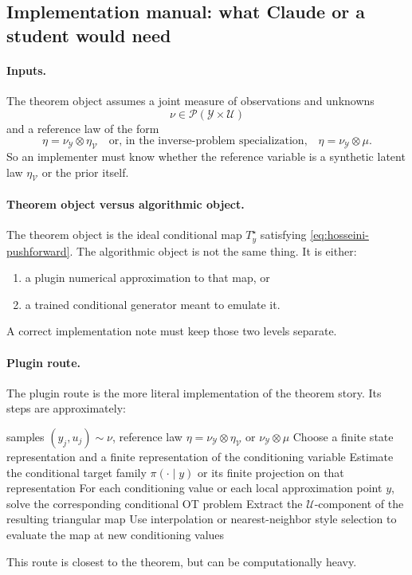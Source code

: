 \documentclass[11pt]{report}
\newcommand{\calP}{\mathcal{P}}
\begin{document}
\subsection*{Implementation manual: what Claude or a student would need}

\paragraph{Inputs.}
The theorem object assumes a joint measure of observations and unknowns
\begin{equation}
\nu \in \calP(\mathcal Y\times \mathcal U)
\label{eq:hosseini-joint-measure}
\end{equation}
and a reference law of the form
\begin{equation}
\eta = \nu_{\mathcal Y}\otimes \eta_{\mathcal V}
\quad\text{or, in the inverse-problem specialization,}\quad
\eta = \nu_{\mathcal Y}\otimes \mu.
\label{eq:hosseini-reference-law}
\end{equation}
So an implementer must know whether the reference variable is a synthetic latent
law $\eta_{\mathcal V}$ or the prior itself.

\paragraph{Theorem object versus algorithmic object.}
The theorem object is the ideal conditional map $T_y^\star$ satisfying
\eqref{eq:hosseini-pushforward}.  The algorithmic object is not the same thing.
It is either:
\begin{enumerate}[label=(\roman*)]
  \item a plugin numerical approximation to that map, or
  \item a trained conditional generator meant to emulate it.
\end{enumerate}
A correct implementation note must keep those two levels separate.

\paragraph{Plugin route.}
The plugin route is the more literal implementation of the theorem story.  Its
steps are approximately:
\begin{algorithm}[ht]
\caption{Plugin conditional OT pipeline}
\begin{algorithmic}[1]
\Require samples $(y_j,u_j)\sim \nu$, reference law $\eta=\nu_{\mathcal Y}\otimes\eta_{\mathcal V}$ or $\nu_{\mathcal Y}\otimes\mu$
\State Choose a finite state representation and a finite representation of the conditioning variable
\State Estimate the conditional target family $\pi(\cdot\mid y)$ or its finite projection on that representation
\State For each conditioning value or each local approximation point $y$, solve the corresponding conditional OT problem
\State Extract the $\mathcal U$-component of the resulting triangular map
\State Use interpolation or nearest-neighbor style selection to evaluate the map at new conditioning values
\end{algorithmic}
\end{algorithm}
This route is closest to the theorem, but can be computationally heavy.
\end{document}
